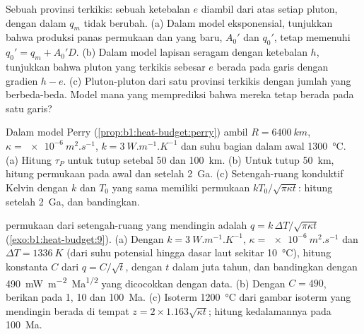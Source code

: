 \begin{exercise}[$\star\star\star$]\label{exo:b1:heat-budget:10}
Sebuah provinsi terkikis: sebuah ketebalan $e$ diambil dari atas setiap pluton, dengan  dalam $q_m$ tidak berubah. (a) Dalam model eksponensial, tunjukkan bahwa produksi panas permukaan dan  yang baru, $A_0'$ dan $q_0'$, tetap memenuhi $q_0' = q_m + A_0'D$. (b) Dalam model lapisan seragam dengan ketebalan $h$, tunjukkan bahwa pluton yang terkikis sebesar $e$ berada pada garis dengan gradien $h - e$. (c) Pluton-pluton dari satu provinsi terkikis dengan jumlah yang berbeda-beda. Model mana yang memprediksi bahwa mereka tetap berada pada satu garis?
\end{exercise}

\begin{exercise}[$\star\star\star$]\label{exo:b1:heat-budget:11}
Dalam model Perry (\cref{prop:b1:heat-budget:perry}) ambil $R = \qty{6400}{km}$,
$\kappa = \qty{e-6}{m^2.s^{-1}}$, $k = \qty{3}{W.m^{-1}.K^{-1}}$ dan suhu bagian dalam awal
\qty{1300}{\degreeCelsius}. (a) Hitung $\tau_P$ untuk tutup setebal 50 dan \qty{100}{km}. (b) Untuk tutup \qty{50}{km}, hitung  permukaan pada awal dan setelah \qty{2}{Ga}. (c) Setengah-ruang konduktif Kelvin dengan $k$ dan $T_0$ yang sama memiliki  permukaan
$kT_0/\sqrt{\pi\kappa t}$: hitung setelah \qty{2}{Ga}, dan bandingkan.
\end{exercise}

\begin{exercise}[$\star\star\star$]\label{exo:b1:heat-budget:12}
 permukaan dari setengah-ruang yang mendingin adalah $q = k\,\Delta T/\sqrt{\pi\kappa t}$ (\cref{exo:b1:heat-budget:9}). (a) Dengan $k = \qty{3}{W.m^{-1}.K^{-1}}$, $\kappa =
\qty{e-6}{m^2.s^{-1}}$ dan $\Delta T = \qty{1336}{K}$ (dari suhu potensial hingga dasar laut sekitar \qty{10}{\degreeCelsius}), hitung konstanta $C$ dari $q = C/\sqrt t$, dengan $t$ dalam juta tahun, dan bandingkan dengan \qty{490}{mW.m^{-2}.Ma^{1/2}} yang dicocokkan dengan data. (b) Dengan $C = 490$, berikan  pada 1, 10 dan \qty{100}{Ma}. (c) Isoterm \qty{1200}{\degreeCelsius} dari gambar isoterm yang mendingin berada di tempat $z = 2\times1.163\sqrt{\kappa t}$; hitung kedalamannya pada \qty{100}{Ma}.
\end{exercise}

